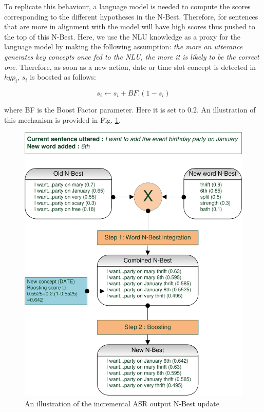         
        To replicate this behaviour, a language model is needed to compute the scores corresponding to the different hypotheses in the N-Best. Therefore, for sentences that are more in alignment with the model will have high scores thus pushed to the top of this N-Best. Here, we use the NLU knowledge as a proxy for the language model by making the following assumption: \textit{the more an utterance generates key concepts once fed to the NLU, the more it is likely to be the correct one}. Therefore, as soon as a new action, date or time slot concept is detected in $hyp_i$, $s_i$ is boosted as follows:
        
        	$$ s_i \leftarrow s_i + BF.(1 - s_i) $$
            
      	where BF is the Boost Factor parameter. Here it is set to 0.2. An illustration of this mechanism is provided in Fig. \ref{fig:asrsimu}.
        
        \begin{figure}[hb]
          \centering
          \includegraphics[scale=1]{figures/ASRSimu.pdf}
          \caption{An illustration of the incremental ASR output N-Best update}
          \label{fig:asrsimu}
        \end{figure}
    

